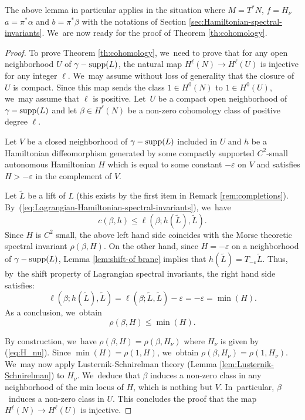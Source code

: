 \documentclass[10pt,a4paper]{amsart}
\theoremstyle{definition}
\DeclareMathOperator{\gammasupp}{\gamma\textup{-supp}}
\begin{document}
The above lemma in particular applies in the situation where $M=T^*N$, $f=H_\nu$ $a=\pi^*\alpha$ and $b=\pi^*\beta$ with the notations of Section \ref{sec:Hamiltonian-spectral-invariants}. We~are now ready for the proof of Theorem \ref{th:cohomology}.


\begin{proof} To prove Theorem \ref{th:cohomology}, we~need to prove that for any open neighborhood $U$ of $\gammasupp(L)$, the natural map $H^\ell(N)\to H^\ell(U)$ is injective for any integer $\ell$. We~may assume without loss of generality that the closure of $U$ is compact. Since this map sends the class $1\in H^0(N)$ to $1\in H^0(U)$, we~may assume that $\ell$ is positive.
Let~$U$ be a compact open neighborhood of $\gammasupp(L)$ and let $\beta\in H^\ell(N)$ be a non-zero cohomology class of positive degree $\ell$.

Let $V$ be a closed neighborhood of $\gammasupp(L)$ included in $U$ and $h$ be a Hamiltonian diffeomorphism generated by some compactly supported $C^2$-small autonomous Hamiltonian $H$ which is equal to some constant $-\varepsilon$ on $V$ and satisfies $H>-\varepsilon$ in the complement of $V$.

Let $\tilde L$ be a lift of $L$ (this exists by the first item in Remark
\ref{rem:completions}). By~(\ref{eq:Lagrangian-Hamiltonian-spectral-invariants}), we~have
\[
c(\beta, h)\leq \ell(\beta; h(\tilde L),\tilde L).
\]
Since $H$ is $C^2$ small, the above left hand side coincides with the Morse theoretic spectral invariant $\rho(\beta, H)$. On the other hand, since $H=-\varepsilon$ on a neighborhood of $\gammasupp (L)$, Lemma \ref{lem:shift-of brane} implies that $h(\tilde L)=T_{-\varepsilon}\tilde L$. Thus, by~the shift property of Lagrangian spectral invariants, the right hand side satisfies:
\[
\ell(\beta; h(\tilde L),\tilde L)=\ell(\beta; \tilde L,\tilde L)-\varepsilon=-\varepsilon=\min(H).
\]
As a conclusion, we~obtain
\[
\rho(\beta, H)\leq\min(H).
\]

By construction, we~have $\rho(\beta, H)=\rho(\beta, H_\nu)$ where $H_\nu$ is given by (\ref{eq:H_nu}). Since $\min(H)=\rho(1,H)$, we~obtain $\rho(\beta, H_\nu)=\rho(1, H_\nu)$. We~may now apply Lusternik-Schnirelman theory (Lemma \ref{lem:Lusternik-Schnirelman}) to $H_\nu$. We~deduce that $\beta$ induces a non-zero class in any neighborhood of the min locus of $H$, which is nothing but $V$. In~particular, $\beta$~induces a non-zero class in $U$. This concludes the proof that the map \hbox{$H^\ell(N)\!\to\! H^\ell(U)$} is injective.
\end{proof}
\end{document}

